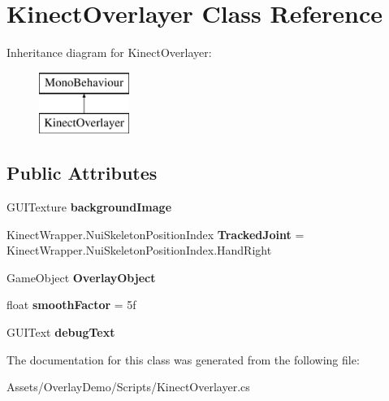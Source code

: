 \hypertarget{class_kinect_overlayer}{}\section{Kinect\+Overlayer Class Reference}
\label{class_kinect_overlayer}
Inheritance diagram for Kinect\+Overlayer\+:\begin{figure}[H]
\begin{center}
\leavevmode
\includegraphics[height=2.000000cm]{class_kinect_overlayer}
\end{center}
\end{figure}
\subsection*{Public Attributes}
\begin{DoxyCompactItemize}
\item 
\mbox{\label{class_kinect_overlayer_a800933f917e122ea689eea7dcf4b162e}} 
G\+U\+I\+Texture {\bfseries background\+Image}
\item 
\mbox{\label{class_kinect_overlayer_a269d0b0fb01f1b0e2ed8980c1e971d68}} 
Kinect\+Wrapper.\+Nui\+Skeleton\+Position\+Index {\bfseries Tracked\+Joint} = Kinect\+Wrapper.\+Nui\+Skeleton\+Position\+Index.\+Hand\+Right
\item 
\mbox{\label{class_kinect_overlayer_ad7639e2eec99a29ab8b33a2467f331bd}} 
Game\+Object {\bfseries Overlay\+Object}
\item 
\mbox{\label{class_kinect_overlayer_a49890aff78624a3501e063ed7269c757}} 
float {\bfseries smooth\+Factor} = 5f
\item 
\mbox{\label{class_kinect_overlayer_acb3b6a851b8cc6cc0e8c092dd279f99e}} 
G\+U\+I\+Text {\bfseries debug\+Text}
\end{DoxyCompactItemize}


The documentation for this class was generated from the following file\+:\begin{DoxyCompactItemize}
\item 
Assets/\+Overlay\+Demo/\+Scripts/Kinect\+Overlayer.\+cs\end{DoxyCompactItemize}

